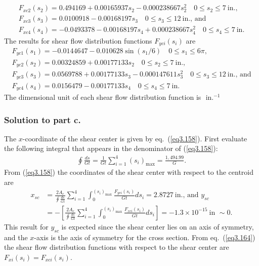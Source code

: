\documentclass{AeroStructure-ERJohnson}
\begin{document}
\begin{example*}
\begin{gather}
F_{x c 2}\left(s_{2}\right)=0.494169+0.00165937 s_{2}-0.000238667 s_{2}^{2} \quad 0 \leq s_{2} \leq 7~\text{in.},\label{ex3.4s}\\[4pt]
F_{x c 3}\left(s_{3}\right)=0.0100918-0.00168197 s_{3} \quad 0 \leq s_{3} \leq 12~\text{in.}\mbox{, and}\label{ex3.4t}\\[4pt]
F_{x c 4}\left(s_{4}\right)=-0.0493378-0.00168197 s_{4}+0.000238667 s_{4}^{2} \quad 0 \leq s_{4} \leq 7~\text{in.}\label{ex3.4u}
\end{gather}
The results for shear flow distribution functions $F_{y c i}\left(s_{i}\right)$ are
\begin{gather}
F_{y c 1}\left(s_{1}\right)=-0.0144647-0.010628 \sin \left(s_{1} / 6\right) \quad 0 \leq s_{1} \leq 6 \pi,\label{ex3.4v}\\
F_{y c 2}\left(s_{2}\right)=0.00324859+0.00177133 s_{2} \quad 0 \leq s_{2} \leq 7~\text{in.},\label{ex3.4w}\\
F_{y c 3}\left(s_{3}\right)=0.0569788+0.00177133 s_{3}-0.000147611 s_{3}^{2} \quad 0 \leq s_{3} \leq 12~\text{in.}\mbox{, and}\label{ex3.4x}\\
F_{y c 4}\left(s_{4}\right)=0.0156479-0.00177133 s_{4} \quad 0 \leq s_{4} \leq 7~\text{in}.\label{ex3.4y}
\end{gather}
The dimensional unit of each shear flow distribution function is $\text { in.}{}^{-1}$

\subsubsection{Solution to part c.} The $x$-coordinate of the shear center is given by eq.~(\ref{eq3.158}). First evaluate the following integral that appears in the denominator of (\ref{eq3.158}):
\begin{align}\label{ex3.4z}
\oint \frac{d s}{G t}=\frac{1}{G t} \sum_{i=1}^{4}\left(s_{i}\right)_{\max }=\frac{1,494.99}{G}.
\end{align}
From (\ref{eq3.158}) the coordinates of the shear center with respect to the centroid are
\begin{align}
x_{s c}&=\frac{2 A_{c}}{\oint{\frac{d s}{Gt}}}\sum^4_{i=1}
\int_{0}^{\left(s_{i}\right)_{\max }}  \frac{F_{y c i}\left(s_{i}\right)}{G t} d s_{i}=2.8727~\mathrm{in.}\mbox{, and }
y_{s c}\nonumber\\
&=-
\left[\frac{2A_{c}}{\oint{\frac{d s}{G t}}} \sum^4_{i=1}
\int^{\left(s_{i}\right)_{\max}}_{0}
\frac{F_{x c i}\left(s_{i}\right)}{G t} d s_{i}\right]=-1.3 \times 10^{-15}~\text{in } \sim 0.\tag{aa}
\end{align}
This result for $y_{\textit{sc}}$ is expected since the shear center lies on an axis of symmetry, and the $x$-axis is the axis of symmetry for the cross section. From eq.~(\ref{eq3.164}) the shear flow distribution functions with respect to the shear center are $F_{x i}\left(s_{i}\right)=F_{x c i}\left(s_{i}\right)$.


\end{example*}
\end{document}
